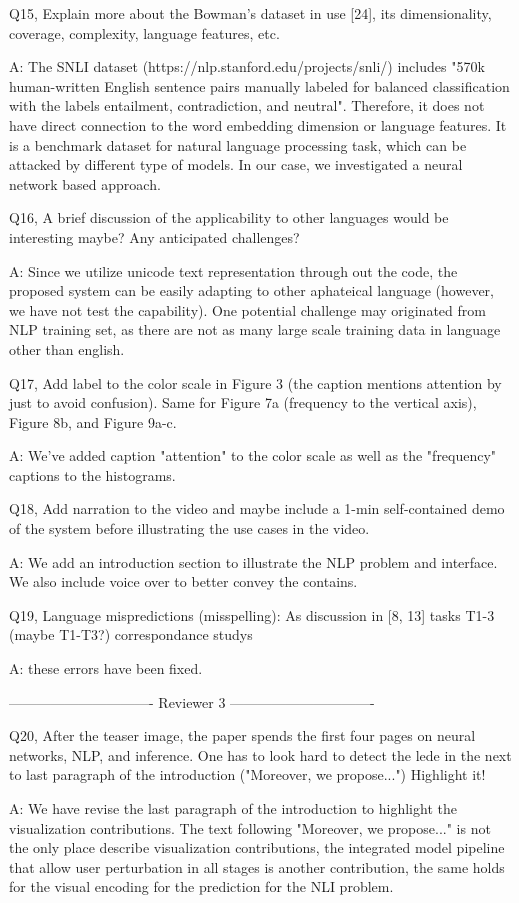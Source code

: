 Q15, Explain more about the Bowman's dataset in use [24], its dimensionality, coverage, complexity, language features, etc.

A: The SNLI dataset (https://nlp.stanford.edu/projects/snli/) includes "570k human-written English sentence pairs manually labeled for balanced classification with the labels entailment, contradiction, and neutral". Therefore, it does not have direct connection to the word embedding dimension or language features. It is a benchmark dataset for natural language processing task, which can be attacked by different type of models. In our case, we investigated a neural network based approach.

Q16, A brief discussion of the applicability to other languages would be interesting maybe? Any anticipated challenges?

A: Since we utilize unicode text representation through out the code, the proposed system can be easily adapting to other aphateical language (however, we have not test the capability). One potential challenge may originated from NLP training set, as there are not as many large scale training data in language other than english.

Q17, Add label to the color scale in Figure 3 (the caption mentions attention by just to avoid confusion). Same for Figure 7a (frequency to the vertical axis), Figure 8b, and Figure 9a-c.

A: We've added caption "attention" to the color scale as well as the "frequency" captions to the histograms.

Q18, Add narration to the video and maybe include a 1-min self-contained demo of the system before illustrating the use cases in the video.

A: We add an introduction section to illustrate the NLP problem and interface. We also include voice over to better convey the contains.

Q19, Language mispredictions (misspelling):
As discussion in [8, 13]
tasks T1-3 (maybe T1-T3?)
correspondance
studys

A: these errors have been fixed.

------------------------------- Reviewer 3 -------------------------------

Q20, After the teaser image, the paper spends the first four pages on neural networks, NLP, and inference. One has to look hard to detect the lede in the next to last paragraph of the introduction ("Moreover, we propose...") Highlight it!

A: We have revise the last paragraph of the introduction to highlight the visualization contributions. The text following "Moreover, we propose..." is not the only place describe visualization contributions, the integrated model pipeline that allow user perturbation in all stages is another contribution, the same holds for the visual encoding for the prediction for the NLI problem.

